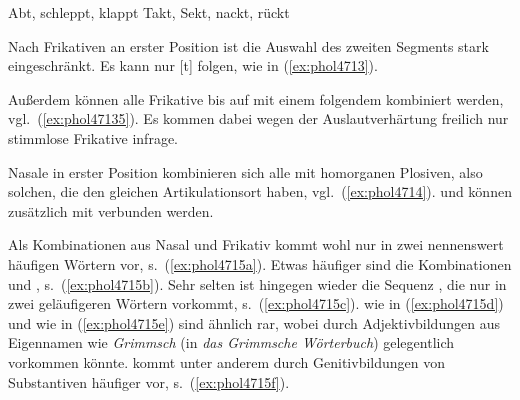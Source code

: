 \begin{exe}
  \ex\label{ex:phol4712}
  \begin{xlist}
  	\ex Abt, schleppt, klappt
  	\ex Takt, Sekt, nackt, rückt
  \end{xlist}
\end{exe}

Nach Frikativen an erster Position ist die Auswahl des zweiten Segments stark eingeschränkt.
Es kann nur [t] folgen, wie in (\ref{ex:phol4713}).

\begin{exe}
\end{exe}

Außerdem können alle Frikative bis auf \textipa{[s]} mit einem folgendem \textipa{[s]} kombiniert werden, vgl.\ (\ref{ex:phol47135}).
Es kommen dabei wegen der Auslautverhärtung freilich nur stimmlose Frikative infrage.

\begin{exe}
\end{exe}

Nasale in erster Position kombinieren sich alle mit homorganen Plosiven, also solchen, die den gleichen Artikulationsort haben, vgl.\ (\ref{ex:phol4714}).
\textipa{[m]} und \textipa{[N]} können zusätzlich mit \textipa{[t]} verbunden werden.

\begin{exe}
  \ex\label{ex:phol4714}
  \begin{xlist}
  \end{xlist}
\end{exe}

Als Kombinationen aus Nasal und Frikativ kommt \textipa{[n\c{c}]} wohl nur in zwei nennenswert häufigen Wörtern vor, s.\ (\ref{ex:phol4715a}).
Etwas häufiger sind die Kombinationen \textipa{[nf]} und \textipa{[ns]}, s.\ (\ref{ex:phol4715b}).
Sehr selten ist hingegen wieder die Sequenz \textipa{[nS]}, die nur in zwei geläufigeren Wörtern vorkommt, s.\ (\ref{ex:phol4715c}).
\textipa{[ms]} wie in (\ref{ex:phol4715d}) und \textipa{[mS]} wie in (\ref{ex:phol4715e}) sind ähnlich rar, wobei \textipa{[mS]} durch Adjektivbildungen aus Eigennamen wie \textit{Grimmsch} (in \textit{das Grimmsche Wörterbuch}) gelegentlich vorkommen könnte.
\textipa{[Ns]} kommt unter anderem durch Genitivbildungen von Substantiven häufiger vor, s.\ (\ref{ex:phol4715f}).

